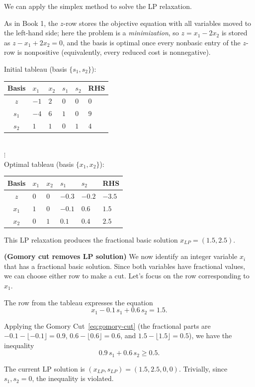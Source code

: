 We can apply the simplex method to solve the LP relaxation.

As in Book 1, the $z$-row stores the objective equation with all variables
moved to the left-hand side; here the problem is a \emph{minimization}, so
$z = x_1 - 2x_2$ is stored as $z - x_1 + 2x_2 = 0$, and the basis is optimal
once every nonbasic entry of the $z$-row is nonpositive (equivalently, every
reduced cost is nonnegative).

\begin{center}
Initial tableau (basis $\{s_1, s_2\}$):\\[3pt]
\renewcommand{\arraystretch}{1.3}
\begin{tabular}{c|ZZZZ|Z}
\toprule
Basis & $x_1$ & $x_2$ & $s_1$ & $s_2$ & RHS\\
\midrule
$z$   & $-1$ & $2$ & $0$ & $0$ & $0$\\
\midrule
$s_1$ & $-4$ & $6$ & $1$ & $0$ & $9$\\
$s_2$ & $1$  & $1$ & $0$ & $1$ & $4$\\
\bottomrule
\end{tabular}\\[8pt]
$\vdots$\\[8pt]
Optimal tableau (basis $\{x_1, x_2\}$):\\[3pt]
\renewcommand{\arraystretch}{1.3}
\begin{tabular}{c|ZZZZ|Z}
\toprule
Basis & $x_1$ & $x_2$ & $s_1$ & $s_2$ & RHS\\
\midrule
{}$z$ & $0$ & $0$ & $-0.3$ & $-0.2$ & $-3.5$\\
\midrule
$x_1$ & $1$ & $0$ & $-0.1$ & $0.6$ & $1.5$\\
$x_2$ & $0$ & $1$ & $0.1$  & $0.4$ & $2.5$\\
\bottomrule
\end{tabular}
\end{center}

This LP relaxation produces the fractional basic solution $x_{LP} = (1.5, 2.5)$.

\begin{example}{}{}\textbf{(Gomory cut  removes LP solution)}{}
 We now identify an integer variable $x_i$ that has a fractional basic solution.  Since both variables have fractional values, we can choose either row to make a cut.  Let's focus on the row corresponding to $x_1$.

The row from the tableau expresses the equation
\begin{equation}
x_1 - 0.1\, s_1 + 0.6\, s_2 = 1.5.
\end{equation}

Applying the Gomory Cut~\eqref{eq:gomory-cut} (the fractional parts are $-0.1 - \lfloor -0.1 \rfloor = 0.9$, $0.6 - \lfloor 0.6 \rfloor = 0.6$, and $1.5 - \lfloor 1.5 \rfloor = 0.5$), we have the inequality
\begin{equation}
\label{eq:gomory-cut-ex1}
0.9\, s_1 + 0.6\, s_2 \geq 0.5.
\end{equation}

The current LP solution is $(x_{LP}, s_{LP}) = (1.5, 2.5,0,0)$.  Trivially, since $s_1, s_2 = 0$, the inequality is violated.
\end{example}

